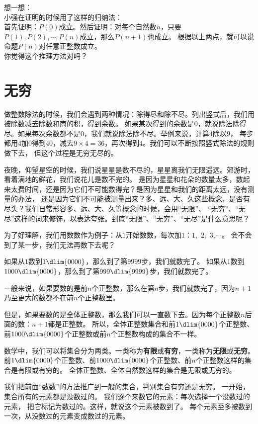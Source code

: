 \begin{sk}\label{sk:2-2-1}
    想一想：\\
    小强在证明的时候用了这样的归纳法：\\
    首先证明：$P(0)$成立。然后证明：对每个自然数$n$，只要$P(1), P(2), \cdots , P(n)$成立，那么$P(n+1)$也成立。
    根据以上两点，就可以说命题$P(n)$对任意正整数成立。\\
    你觉得这个推理方法对吗？
\end{sk}

\section{无穷}
做整数除法的时候，我们会遇到两种情况：除得尽和除不尽。列出竖式后，我们用被除数减去除数和商的积，得到余数。
如果某次得到的余数是$0$，就说除法除得尽。如果每次余数都不是$0$，我们就说除法除不尽。举例来说，计算$4$除以$9$，
每步都用$4$加$0$得到$40$，减去$9\times 4=36$，再次得到$4$。我们可以不断按照竖式除法的规则做下去，
但这个过程是无穷无尽的。

夜晚，仰望星空的时候，我们说星星是数不尽的，星星离我们无限遥远。郊游时，看着满地的鲜花，我们说花儿是数不完的。
是因为星星和花朵的数量太多，数起来太费时间，还是因为它们不可能数得完？是因为星星和我们的距离太远，没有测量的办法，
还是因为它们不可能被测量出来？多、远、大、久这些概念，是否有尽头？我们日常形容多、远、大、久等概念的时候，会用“无限”、
“无穷”、“无尽”这样的词来修饰，以表达夸张。到底“无限”、“无穷”、“无尽”是什么意思呢？

为了好理解，我们用数数作为例子：从$1$开始数数，每次加$1$：$1,\,\,2,\,\,3,\cdots$。
会不会到了某一步，我们无法再数下去呢？

如果从$1$数到$1\dlim{0000}$，那么到了第$9999$步，我们就数完了。
如果从$1$数到$1000\dlim{0000}$，那么到了第$999\dlim{9999}$步，我们就数完了。

一般来说，如果要数的是前$n$个正整数，那么在第$n$步，我们就数完了，因为$n+1$乃至更大的数都不在前$n$个正整数里。

但是，如果要数的是全体正整数，那么我们可以一直数下去。因为每个正整数$n$后面的数：$n+1$都是正整数。
所以，全体正整数集合和前$1\dlim{0000}$个正整数、前$1000\dlim{0000}$个正整数或前$n$个正整数构成的集合不一样。

数学中，我们可以将集合分为两类。一类称为\textbf{有限}或\textbf{有穷}，一类称为\textbf{无限}或\textbf{无穷}。
前$1\dlim{0000}$个正整数、前$1000\dlim{0000}$个正整数、前$n$个正整数这样的集合是有限或有穷的。
全体正整数、全体自然数这样的集合是无限或无穷的。

我们把前面“数数”的方法推广到一般的集合，判别集合有穷还是无穷。
一开始，集合所有的元素都是没数过的。
我们逐个来数它的元素：每次选择一个没数过的元素，
把它标记为数过的。这样，就说这个元素被数到了。
每个元素至多被数到一次，从没数过的元素变成数过的元素。

